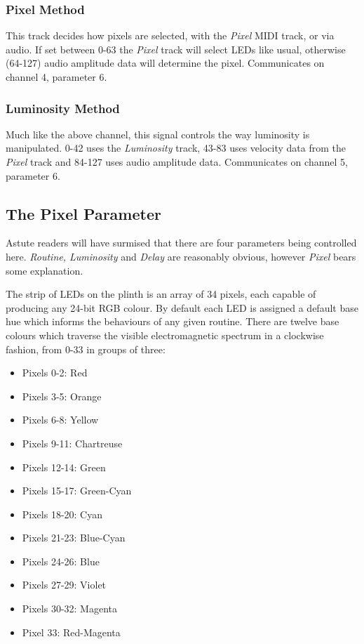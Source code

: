 \documentclass{article}
\begin{document}
	\subsubsection{Pixel Method}
	This track decides how pixels are selected, with the \emph{Pixel} MIDI 
	track, or via audio. If set between 0-63 the \emph{Pixel} track will select 
	LEDs like usual, otherwise (64-127) audio amplitude data will determine 
	the pixel. Communicates on channel 4, parameter 6.

	\subsubsection{Luminosity Method}
	Much like the above channel, this signal controls the way luminosity is 
	manipulated. 0-42 uses the \emph{Luminosity} track, 43-83 uses velocity 
	data from the \emph{Pixel} track and 84-127 uses audio amplitude data. 
	Communicates on channel 5, parameter 6.

	\subsection{The Pixel Parameter}
	Astute readers will have surmised that there are four parameters being 
	controlled here. \emph{Routine, Luminosity} and \emph{Delay} are reasonably 
	obvious, however \emph{Pixel} bears some explanation.

	The strip of LEDs on the plinth is an array of 34 pixels, each capable of 
	producing any 24-bit RGB colour. By default each LED is assigned a default 
	base hue which informs the behaviours of any given routine. There are 
	twelve base colours which traverse the visible electromagnetic spectrum in 
	a clockwise fashion, from 0-33  in groups of three:
	\begin{itemize}
		\item Pixels 0-2: Red
		\item Pixels 3-5: Orange
		\item Pixels 6-8: Yellow
		\item Pixels 9-11: Chartreuse
		\item Pixels 12-14: Green
		\item Pixels 15-17: Green-Cyan
		\item Pixels 18-20:	Cyan
		\item Pixels 21-23: Blue-Cyan
		\item Pixels 24-26:	Blue
		\item Pixels 27-29:	Violet
		\item Pixels 30-32: Magenta
		\item Pixel 33: Red-Magenta
	\end{itemize}
\end{document}
